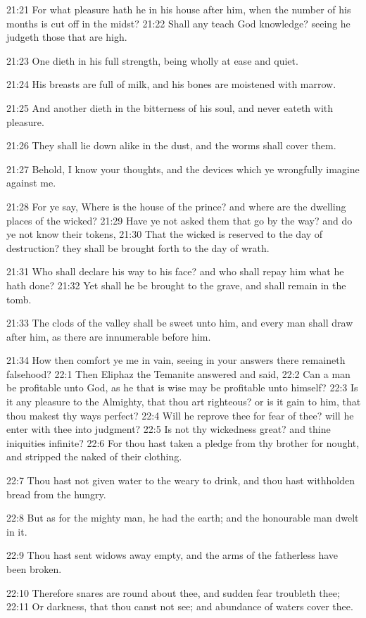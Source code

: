 21:21 For what pleasure hath he in his house after him, when the
number of his months is cut off in the midst?  21:22 Shall any teach
God knowledge? seeing he judgeth those that are high.

21:23 One dieth in his full strength, being wholly at ease and quiet.

21:24 His breasts are full of milk, and his bones are moistened with
marrow.

21:25 And another dieth in the bitterness of his soul, and never
eateth with pleasure.

21:26 They shall lie down alike in the dust, and the worms shall cover
them.

21:27 Behold, I know your thoughts, and the devices which ye
wrongfully imagine against me.

21:28 For ye say, Where is the house of the prince? and where are the
dwelling places of the wicked?  21:29 Have ye not asked them that go
by the way? and do ye not know their tokens, 21:30 That the wicked is
reserved to the day of destruction? they shall be brought forth to the
day of wrath.

21:31 Who shall declare his way to his face? and who shall repay him
what he hath done?  21:32 Yet shall he be brought to the grave, and
shall remain in the tomb.

21:33 The clods of the valley shall be sweet unto him, and every man
shall draw after him, as there are innumerable before him.

21:34 How then comfort ye me in vain, seeing in your answers there
remaineth falsehood?  22:1 Then Eliphaz the Temanite answered and
said, 22:2 Can a man be profitable unto God, as he that is wise may be
profitable unto himself?  22:3 Is it any pleasure to the Almighty,
that thou art righteous? or is it gain to him, that thou makest thy
ways perfect?  22:4 Will he reprove thee for fear of thee? will he
enter with thee into judgment?  22:5 Is not thy wickedness great? and
thine iniquities infinite?  22:6 For thou hast taken a pledge from thy
brother for nought, and stripped the naked of their clothing.

22:7 Thou hast not given water to the weary to drink, and thou hast
withholden bread from the hungry.

22:8 But as for the mighty man, he had the earth; and the honourable
man dwelt in it.

22:9 Thou hast sent widows away empty, and the arms of the fatherless
have been broken.

22:10 Therefore snares are round about thee, and sudden fear troubleth
thee; 22:11 Or darkness, that thou canst not see; and abundance of
waters cover thee.

